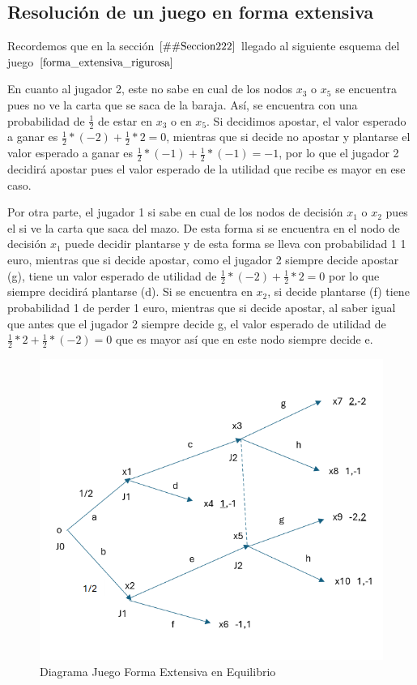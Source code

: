 \documentclass[12pt,a4paper,]{book}
\numberwithin{dummy}{section}
\theoremstyle{ocrenumbox}
\theoremstyle{blacknumex}
\theoremstyle{blacknumbox}
\theoremstyle{ocrenum}
\theoremstyle{ocrenum}
\begin{document}
\hypertarget{Seccion232}{%
\subsection{Resolución de un juego en forma
extensiva}\label{Seccion232}}

Recordemos que en la sección \(\ref{#Seccion222}\) llegado al siguiente
esquema del juego \(\ref{forma_extensiva_rigurosa}\)

En cuanto al jugador 2, este no sabe en cual de los nodos \(x_3\) o
\(x_5\) se encuentra pues no ve la carta que se saca de la baraja. Así,
se encuentra con una probabilidad de \(\frac{1}{2}\) de estar en \(x_3\)
o en \(x_5\). Si decidimos apostar, el valor esperado a ganar es
\(\frac{1}{2}*(-2) +\frac{1}{2}*2 =0\), mientras que si decide no
apostar y plantarse el valor esperado a ganar es
\(\frac{1}{2}*(-1) +\frac{1}{2}*(-1) =-1\), por lo que el jugador 2
decidirá apostar pues el valor esperado de la utilidad que recibe es
mayor en ese caso.

Por otra parte, el jugador 1 si sabe en cual de los nodos de decisión
\(x_1\) o \(x_2\) pues el si ve la carta que saca del mazo. De esta
forma si se encuentra en el nodo de decisión \(x_1\) puede decidir
plantarse y de esta forma se lleva con probabilidad 1 1 euro, mientras
que si decide apostar, como el jugador 2 siempre decide apostar (g),
tiene un valor esperado de utilidad de
\(\frac{1}{2}*(-2) +\frac{1}{2}*2 =0\) por lo que siempre decidirá
plantarse (d). Si se encuentra en \(x_2\), si decide plantarse (f) tiene
probabilidad 1 de perder 1 euro, mientras que si decide apostar, al
saber igual que antes que el jugador 2 siempre decide g, el valor
esperado de utilidad de \(\frac{1}{2}*2 +\frac{1}{2}*(-2) =0\) que es
mayor así que en este nodo siempre decide e.

\begin{figure}[H]

{\centering \includegraphics[width=0.8\linewidth]{forma_extensiva_equilibrio} 

}

\caption{\label{forma_extensiva_equilibrio}Diagrama Juego Forma Extensiva en Equilibrio}\label{fig:forma_extensiva_equilibrio}
\end{figure}




%
\end{document}
